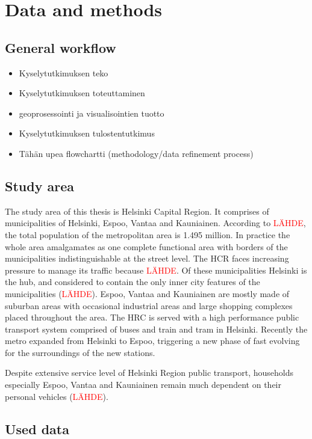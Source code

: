 \section{Data and methods}
\subsection{General workflow}
\justify
\begin{itemize}
    \item Kyselytutkimuksen teko
    \item Kyselytutkimuksen toteuttaminen
    \item geoprosessointi ja visualisointien tuotto
    \item Kyselytutkimuksen tulostentutkimus
    \item Tähän upea flowchartti (methodology/data refinement process)
\end{itemize}

\subsection{Study area}
\justify
The study area of this thesis is Helsinki Capital Region. It comprises of municipalities of Helsinki, Espoo, Vantaa and Kauniainen. According to \textcolor{red}{LÄHDE}, the total population of the metropolitan area is 1.495 million. In practice the whole area amalgamates as one complete functional area with borders of the municipalities indistinguishable at the street level. The HCR faces increasing pressure to manage its traffic because \textcolor{red}{LÄHDE}. Of these municipalities Helsinki is the hub, and considered to contain the only inner city features of the municipalities (\textcolor{red}{LÄHDE}). Espoo, Vantaa and Kauniainen are mostly made of suburban areas with occasional industrial areas and large shopping complexes placed throughout the area. The HRC is served with a high performance public transport system comprised of buses and train and tram in Helsinki. Recently the metro expanded from Helsinki to Espoo, triggering a new phase of fast evolving for the surroundings of the new stations.

Despite extensive service level of Helsinki Region public transport, households especially Espoo, Vantaa and Kauniainen remain much dependent on their personal vehicles (\textcolor{red}{LÄHDE}). 

\subsection{Used data}
\justify

